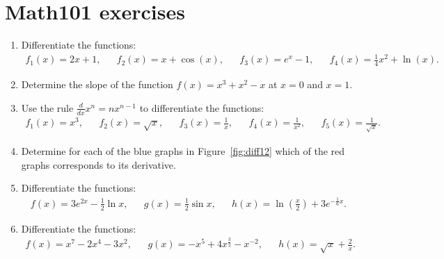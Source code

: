 \newpage
\section{Math101 exercises}
\begin{enumerate}
	\item Differentiate the functions:
	\begin{align*}
	f_1(x)=2x+1,&& f_2(x)=x+\cos(x),&& f_3(x)=e^x-1,&&f_4(x)=\frac{1}{4}x^2+\ln(x).
	\end{align*}
	
	
	\item Determine the slope of the function $f(x)=x^3+x^2-x$ at $x=0$ and $x=1$.

	\item Use the rule $\frac{d}{dx} x^n=nx^{n-1}$ to differentiate the functions:
	\begin{align*}
	f_1(x)=x^3,&& f_2(x)=\sqrt{x},&& f_3(x)=\frac{1}{x},&&f_4(x)=\frac{1}{x^2},&&f_5(x)=\frac{1}{\sqrt{x}}.
	\end{align*}
	\item \label{it:diff12} Determine for each of the blue graphs in Figure~\ref{fig:diff12} which of the red graphs corresponds to its derivative.
	
	\item Differentiate the functions:
	\begin{align*}
	f(x)=3e^{2x}-\frac{1}{2}\ln x,&& g(x)=\frac{1}{2}\sin x,&& h(x)=\ln(\frac{x}{2})+3e^{-\frac{1}{6}x}.
	\end{align*}
	
	\item Differentiate the functions:
	\begin{align*}
	f(x)=x^7-2x^4-3x^2,&&g(x)=-x^5+4x^{\frac{3}{2}}-x^{-2},&&h(x)=\sqrt{x}+\frac{2}{x}.
	\end{align*}
	
	\begin{figure}
		\centering
		

\end{figure}
\end{enumerate}

